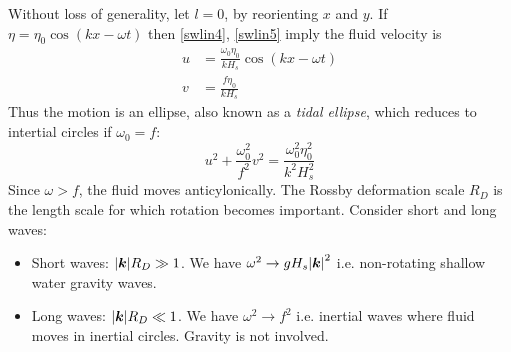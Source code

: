 \documentclass{jknotes}
\begin{document}
Without loss of generality, let $l = 0$, by reorienting $x$ and $y$. If $\eta
= \eta_0 \cos(kx-\omega t)$ then \eqref{swlin4}, \eqref{swlin5} imply the
fluid velocity is
\begin{align}
	u &= \frac{\omega_0 \eta_0}{k H_s} \cos(kx-\omega t) \\
	v &= \frac{f \eta_0}{k H_s}
\end{align}
Thus the motion is an ellipse, also known as a \emph{tidal ellipse}, which
reduces to intertial circles if $\omega_0 = f$:
\begin{equation}
	u^2 + \frac{\omega_0^2}{f^2} v^2 = \frac{\omega_0^2 \eta_0^2}{k^2 H_s^2}
\end{equation}
Since $\omega > f$, the fluid moves anticylonically. The Rossby deformation
scale $R_D$ is the length scale for which rotation becomes important. Consider
short and long waves:
\begin{itemize}
	\item Short waves: $\abs{\bm{k}} R_D \gg 1$. We have $\omega^2 \to g H_s
		\abs{\bm{k}}^2$ i.e. non-rotating shallow water gravity waves.
	\item Long waves: $\abs{\bm{k}}R_D \ll 1$. We have $\omega^2 \to f^2$ i.e.
		inertial waves where fluid moves in inertial circles. Gravity is not
		involved.
\end{itemize}
\end{document}
